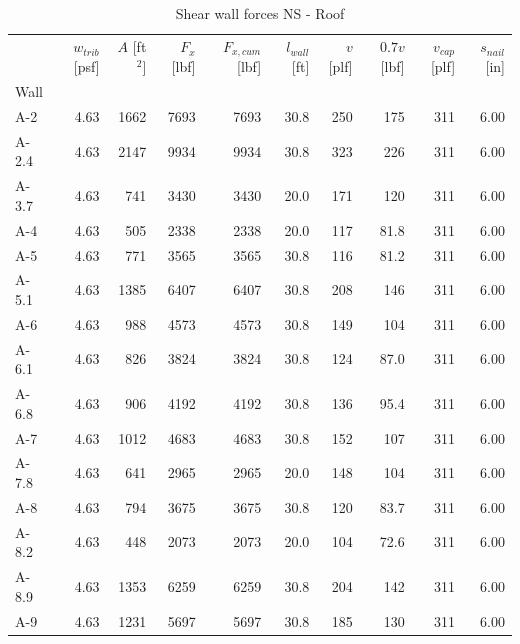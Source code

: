 \documentclass[11pt]{article}
\begin{document}
    \begin{table}[H]
\centering
\caption{Shear wall forces NS - Roof}
\label{tab:shear_wall_forces_roof_ns}
\begin{tabular}{lrrrrrrrrr}
\toprule
 & $w_{trib}$ [psf] & $A$ [ft$^2$] & $F_x$ [lbf] & $F_{x,cum}$ [lbf] & $l_{wall}$ [ft] & $v$ [plf] & $0.7 v$ [lbf] & $v_{cap}$ [plf] & $s_{nail}$ [in] \\
Wall &  &  &  &  &  &  &  &  &  \\
\midrule
A-2 & 4.63 & 1662 & 7693 & 7693 & 30.8 & 250 & 175 & 311 & 6.00 \\
A-2.4 & 4.63 & 2147 & 9934 & 9934 & 30.8 & 323 & 226 & 311 & 6.00 \\
A-3.7 & 4.63 & 741 & 3430 & 3430 & 20.0 & 171 & 120 & 311 & 6.00 \\
A-4 & 4.63 & 505 & 2338 & 2338 & 20.0 & 117 & 81.8 & 311 & 6.00 \\
A-5 & 4.63 & 771 & 3565 & 3565 & 30.8 & 116 & 81.2 & 311 & 6.00 \\
A-5.1 & 4.63 & 1385 & 6407 & 6407 & 30.8 & 208 & 146 & 311 & 6.00 \\
A-6 & 4.63 & 988 & 4573 & 4573 & 30.8 & 149 & 104 & 311 & 6.00 \\
A-6.1 & 4.63 & 826 & 3824 & 3824 & 30.8 & 124 & 87.0 & 311 & 6.00 \\
A-6.8 & 4.63 & 906 & 4192 & 4192 & 30.8 & 136 & 95.4 & 311 & 6.00 \\
A-7 & 4.63 & 1012 & 4683 & 4683 & 30.8 & 152 & 107 & 311 & 6.00 \\
A-7.8 & 4.63 & 641 & 2965 & 2965 & 20.0 & 148 & 104 & 311 & 6.00 \\
A-8 & 4.63 & 794 & 3675 & 3675 & 30.8 & 120 & 83.7 & 311 & 6.00 \\
A-8.2 & 4.63 & 448 & 2073 & 2073 & 20.0 & 104 & 72.6 & 311 & 6.00 \\
A-8.9 & 4.63 & 1353 & 6259 & 6259 & 30.8 & 204 & 142 & 311 & 6.00 \\
A-9 & 4.63 & 1231 & 5697 & 5697 & 30.8 & 185 & 130 & 311 & 6.00 \\
\bottomrule
\end{tabular}
\end{table}
\end{document}
